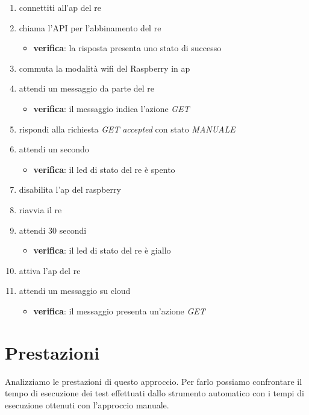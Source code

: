 \documentclass[12pt,a4paper,twoside,titlepage]{book}
\begin{document}
\begin{enumerate}
    \item connettiti all'\acrshort{ap} del \acrshort{re}
    \item chiama l'API per l'abbinamento del \acrshort{re} 
    \begin{itemize}
        \item \textbf{verifica}: la risposta presenta uno stato di successo 
    \end{itemize}
    \item commuta la modalità \Gls{wifi} del Raspberry in \acrshort{ap}
    \item attendi un messaggio da parte del \acrshort{re}
    \begin{itemize}
        \item \textbf{verifica}: il messaggio indica l'azione \textit{GET}
    \end{itemize}
    \item rispondi alla richiesta \textit{GET} \textit{accepted} con stato \textit{MANUALE}
    \item attendi un secondo 
    \begin{itemize}
        \item \textbf{verifica}: il \acrshort{led} di stato del \acrshort{re} è spento 
    \end{itemize}
    \item disabilita l'\acrshort{ap} del raspberry 
    \item riavvia il \acrshort{re}
    \item attendi 30 secondi 
    \begin{itemize}
        \item \textbf{verifica}: il \acrshort{led} di stato del \acrshort{re} è giallo 
    \end{itemize}
    \item attiva l'\acrshort{ap} del \acrshort{re}
    \item attendi un messaggio su cloud 
    \begin{itemize}
        \item \textbf{verifica}: il messaggio presenta un'azione \textit{GET}
    \end{itemize}
\end{enumerate}
\section{Prestazioni}

Analizziamo le prestazioni di questo approccio. Per farlo possiamo confrontare il tempo di esecuzione 
dei test effettuati dallo strumento automatico con i tempi di esecuzione ottenuti con l'approccio manuale. 
\end{document}
